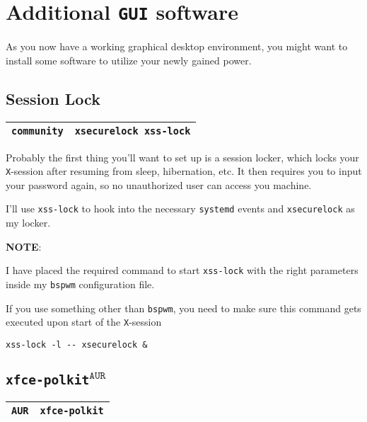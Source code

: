 \documentclass[9pt]{report}
\newcommand{\admonition}[2]{\textbf{#1}: {#2}}
\begin{document}
\vfill\eject

\hypertarget{x-additional-gui-software}{\section{Additional \texttt{GUI} software}}
As you now have a working graphical desktop environment, you might want to install some software to utilize your newly gained power.



\vfill\eject

\hypertarget{x-session-lock}{\subsection{Session Lock}}
\begin{center}
\begin{tabular}{|c|c|}
\hline
\texttt{community} & \texttt{xsecurelock xss-lock} \\ 
\hline
\end{tabular}
\end{center}

Probably the first thing you’ll want to set up is a session locker, which locks your \texttt{X}-session after resuming from sleep, hibernation, etc.
It then requires you to input your password again, so no unauthorized user can access you machine.


I’ll use \texttt{xss-lock} to hook into the necessary \texttt{systemd} events and \texttt{xsecurelock} as my locker.


\admonition{NOTE}{I have placed the required command to start \texttt{xss-lock} with the right parameters inside my \texttt{bspwm} configuration file.


If you use something other than \texttt{bspwm}, you need to make sure this command gets executed upon start of the \texttt{X}-session


}
\begin{verbatim}
xss-lock -l -- xsecurelock &
\end{verbatim}

\vfill\eject

\hypertarget{x-xfce-polkit-aur}{\subsection{\texttt{xfce-polkit}${}^{\texttt{AUR}}$}}
\begin{center}
\begin{tabular}{|c|c|}
\hline
\texttt{AUR} & \texttt{xfce-polkit} \\ 
\hline
\end{tabular}
\end{center}
\end{document}
